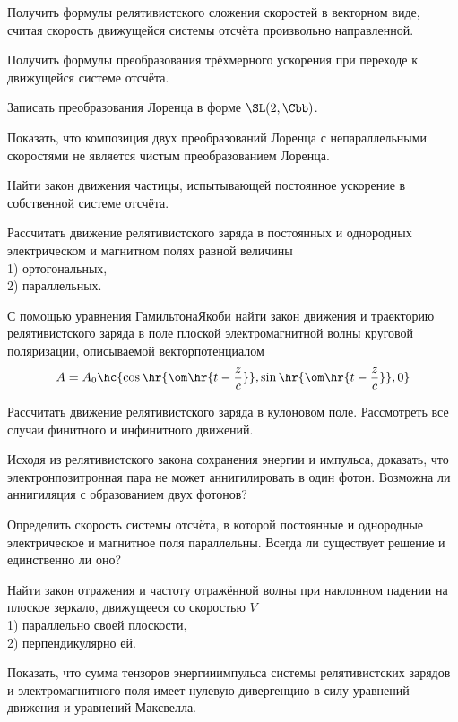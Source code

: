 \documentclass[a4paper,draft]{article}
\begin{document}
\begin{nums}{-2}
\item  Получить формулы релятивистского сложения скоростей
в векторном виде, считая скорость движущейся системы отсчёта
произвольно направленной.
\item Получить формулы преобразования трёхмерного ускорения
при переходе к движущейся системе отсчёта.
\item Записать преобразования Лоренца в форме $\SL(2,\Cbb)$.
\item Показать, что композиция двух преобразований Лоренца
с непараллельными скоростями не является чистым преобразованием Лоренца.
\item Найти закон движения частицы, испытывающей постоянное ускорение
в собственной системе отсчёта.
\item Рассчитать движение релятивистского заряда в постоянных
и однородных электрическом и магнитном полях равной величины\\
1) ортогональных,\\
2) параллельных.
\item С помощью уравнения Гамильтона\ч Якоби найти закон движения
и траекторию релятивистского заряда в поле плоской электромагнитной
волны круговой поляризации, описываемой вектор\д потенциалом
$$A = A_0 \hc{\cos\hr{\om\hr{t-\frac{z}{c}}}, \sin\hr{\om\hr{t - \frac{z}{c}}},0}$$
\item Рассчитать движение релятивистского заряда в кулоновом поле.
Рассмотреть все случаи финитного и инфинитного движений.
\item Исходя из релятивистского закона сохранения энергии и импульса,
доказать, что электрон\д позитронная пара не может аннигилировать в один фотон.
Возможна ли аннигиляция с образованием двух фотонов?
\item Определить скорость системы отсчёта, в которой постоянные и однородные
электрическое и магнитное поля параллельны. Всегда ли существует решение
и единственно ли оно?
\item Найти закон отражения и частоту отражённой волны при наклонном падении
на плоское зеркало, движущееся со скоростью $V$\\
1) параллельно своей плоскости,\\
2) перпендикулярно ей.
\item Показать, что сумма тензоров энергии\д импульса системы релятивистских зарядов
и электромагнитного поля имеет нулевую дивергенцию в силу уравнений
движения и уравнений Максвелла.
\end{nums}
\end{document}
